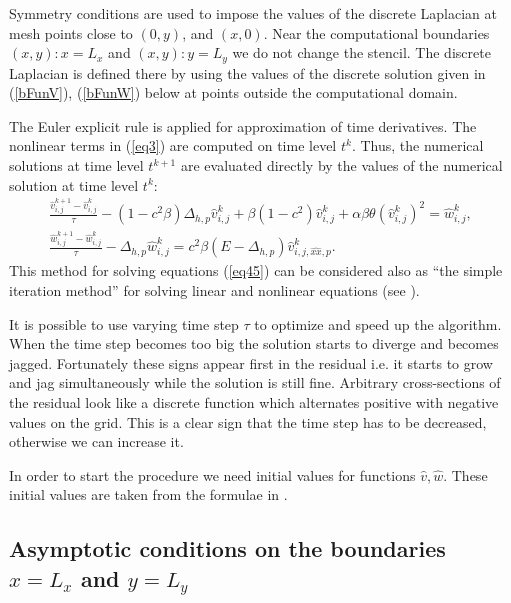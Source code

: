 \documentclass[preprint]{elsarticle}
\newcommand{\rf}[1]{(\ref{#1})}
\begin{document}
Symmetry conditions are used to impose the values of the discrete Laplacian at mesh points close to ${(0,y)}$, and $(x,0)$. 
Near  the computational boundaries $(x,y):x=L_x$ and $(x,y):y=L_y$ we do not change the stencil. The discrete Laplacian
is defined  there by using the values of the discrete solution given in \rf{bFunV}, \rf{bFunW} below at  points outside the computational domain.

\par
The Euler explicit rule is applied for approximation of  time derivatives. The nonlinear terms in \rf{eq3} are computed on    time level $t^k$. Thus, the numerical solutions at time level $t^{k+1}$ are evaluated directly by the values of the numerical solution at time level $t^k$:  
 \begin{equation}\label{eq55}
 \begin{split}
   \frac {\widehat{v}_{i,j}^{k+1}-\widehat{v}_{i,j}^{k}}{\tau}- (1-c^2 \beta) \Delta_{h,p} \widehat{v} _{i,j}^{k}+ \beta (1-c^2     ) \widehat{v}_{i,j}^{k} + \alpha \beta \theta (\widehat{v}_{i,j}^{k})^2 = \widehat{w}_{i,j}^{k}, \\
  \frac  {\widehat{w}_{i,j}^{k+1} -\widehat{w}_{i,j}^{k}} {\tau} - \Delta_{h,p} \widehat{w}_{i,j}^{k} =  c^2 \beta (E- \Delta_{h,p})       
    \widehat{v}_{i,j,{\widehat{xx},p}}^{k}. \;\;\;\; \;\;\;\;\;\;\;\;\;\;\;\;
\end{split}
\end{equation}
This method for solving equations 
\rf{eq45} can be considered also as ``the simple iteration method'' for solving linear and nonlinear equations (see \cite{sam}).


\begin{rmk}\label{R1}
It is possible to use varying time step $\tau$ to optimize and speed up the algorithm. When the time step becomes too big the solution starts to diverge and becomes jagged. Fortunately these signs appear first in the residual i.e. it
starts to grow and jag simultaneously while the solution is still fine. 
Arbitrary cross-sections of the residual look like a discrete function
which alternates positive with negative values on the grid.
This is a clear sign that the time step has to be decreased, otherwise we can increase it.
\end{rmk}
 In order to start the procedure we need initial values for functions $\widehat{v},\widehat{w}$. These initial values are taken from the  formulae in \cite{Ch2011}.
 
\subsection{Asymptotic conditions on the  boundaries $x=L_x$ and $y=L_y$}
\end{document}
